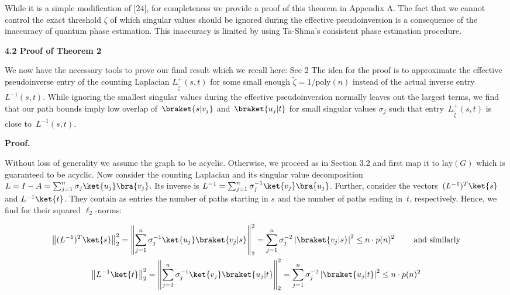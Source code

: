 \documentclass[10pt,a4paper]{article}
\begin{document}



While it is a simple modification of [24], for completeness we provide a proof of this theorem in Appendix A.
The fact that we cannot control the exact threshold $\zeta$ of which singular values should be ignored during the effective pseudoinversion is a consequence of the inaccuracy of quantum phase estimation. This inaccuracy is limited by using Ta-Shma’s consistent phase estimation procedure.\par





\par\medskip\noindent\textbf{
4.2 Proof of Theorem 2}\par




We now have the necessary tools to prove our final result which we recall here:
See 2
The idea for the proof is to approximate the effective pseudoinverse entry of the counting Laplacian $L^{+}_{\tilde{\zeta}}(s,t)$ for some small enough $\tilde{\zeta}=1/\mathrm{poly}(n)$ instead of the actual inverse entry $L^{-1}(s,t)$.
While ignoring the smallest singular values during the effective pseudoinversion normally leaves out the largest terms, we find that our path bounds imply low overlap of $\braket{s|v_{j}}$ and $\braket{u_{j}|t}$ for small singular values $\sigma_{j}$ such that entry $L^{+}_{\tilde{\zeta}}(s,t)$ is close to $L^{-1}(s,t)$.\par




\par\medskip\noindent\textbf{Proof.}\par




Without loss of generality we assume the graph to be acyclic. Otherwise, we proceed as in Section 3.2 and first map it to $\mathrm{lay}(G)$ which is guaranteed to be acyclic.
Now consider the counting Laplacian and its singular value decomposition $L=I-A=\sum_{j=1}^{n}\sigma_{j}\ket{u_{j}}\bra{v_{j}}$. Its inverse is $L^{-1}=\sum_{j=1}^{n}\sigma_{j}^{-1}\ket{v_{j}}\bra{u_{j}}$.
Further, consider the vectors $(L^{-1})^{T}\ket{s}$ and $L^{-1}\ket{t}$.
They contain as entries the number of paths starting in $s$ and the number of paths ending in $t$, respectively. Hence, we find for their squared $\ell_{2}$-norms:\par


\[\begin{gathered}
\displaystyle\left\|(L^{-1})^{T}\ket{s}\right\|_{2}^{2} \displaystyle=\left\|\sum_{j=1}^{n}\sigma_{j}^{-1}\ket{u_{j}}\braket{v_{j}|s}\right\|_{2}^{2}=\sum_{j=1}^{n}\sigma_{j}^{-2}\left|\braket{v_{j}|s}\right|^{2}\leq n\cdot p(n)^{2}\qquad\text{ and similarly} \\
\displaystyle\left\|L^{-1}\ket{t}\right\|_{2}^{2} \displaystyle=\left\|\sum_{j=1}^{n}\sigma_{j}^{-1}\ket{v_{j}}\braket{u_{j}|t}\right\|_{2}^{2}=\sum_{j=1}^{n}\sigma_{j}^{-2}\left|\braket{u_{j}|t}\right|^{2}\leq n\cdot p(n)^{2}
\end{gathered}\]
\end{document}
